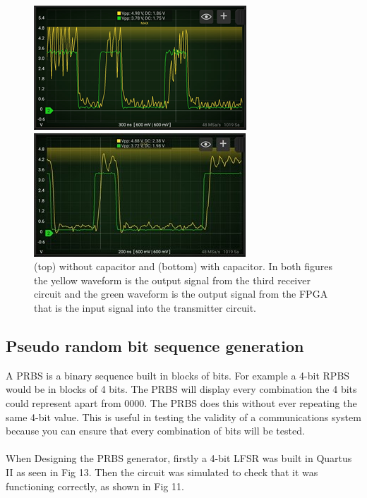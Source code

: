 \documentclass[conference]{IEEEtran}
\begin{document}
\begin{figure}[h!]
\centerline{\includegraphics[width=0.8\linewidth]{fig 11a.png}}\par
\centerline{\includegraphics[width=0.8\linewidth]{fig 11b.jpg}}\par
\caption{(top) without capacitor and (bottom) with capacitor. In both figures the yellow waveform is the output signal from the third receiver circuit and the green waveform is the output signal from the FPGA that is the input signal into the transmitter circuit.}
\label{fig}
\end{figure}

\subsection{Pseudo random bit sequence generation}

A PRBS is a binary sequence built in blocks of bits. For example a 4-bit RPBS would be in blocks of 4 bits. The PRBS will display every combination the 4 bits could represent apart from 0000. The PRBS does this without ever repeating the same 4-bit value. This is useful in testing the validity of a communications system because you can ensure that every combination of bits will be tested.
\\\\
When Designing the PRBS generator, firstly a 4-bit LFSR was built in Quartus II as seen in Fig 13. 
Then the circuit was simulated to check that it was functioning correctly, as shown in Fig 11. \\
\end{document}

